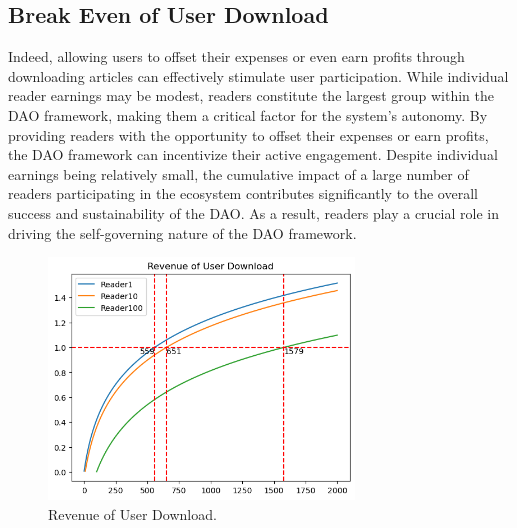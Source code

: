\documentclass[lettersize,journal]{IEEEtran}
\begin{document}
\subsection{Break Even of User Download}

Indeed, allowing users to offset their expenses or even earn profits through downloading articles can effectively stimulate user participation. While individual reader earnings may be modest, readers constitute the largest group within the DAO framework, making them a critical factor for the system's autonomy.
By providing readers with the opportunity to offset their expenses or earn profits, the DAO framework can incentivize their active engagement. Despite individual earnings being relatively small, the cumulative impact of a large number of readers participating in the ecosystem contributes significantly to the overall success and sustainability of the DAO. As a result, readers play a crucial role in driving the self-governing nature of the DAO framework.

\begin{figure}[h]
  \centering
  \includegraphics[width=3.2in]{assets/revenue-user-download.png}
  \caption{Revenue of User Download.}
  \label{fig:revenue-user-download}
\end{figure}
\end{document}
